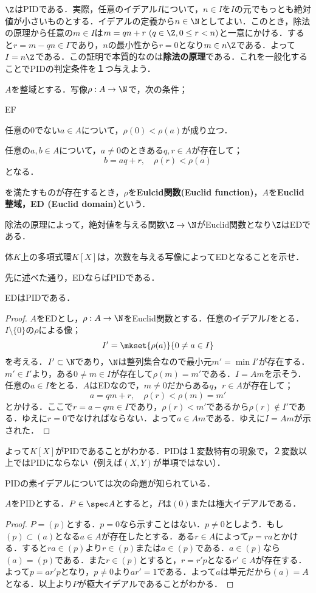 $\Z$はPIDである．実際，任意のイデアル$I$について，$n\in I$を$I$の元でもっとも絶対値が小さいものとする．イデアルの定義から$n\in\N$としてよい．このとき，除法の原理から任意の$m\in I$は$m=qn+r~(q\in\Z,0\leq r<n)$と一意にかける．すると$r=m-qn\in I$であり，$n$の最小性から$r=0$となり$m\in n\Z$である．よって$I=n\Z$である．この証明で本質的なのは\textbf{除法の原理}である．これを一般化することでPIDの判定条件を１つ与えよう．

\begin{defi}[Euclid整域]
	$A$を整域とする．写像$\rho:A\to\N$で，次の条件；
	\begin{defiterm}{EF}
		\item 任意の$0$でない$a\in A$について，$\rho(0)<\rho(a)$が成り立つ．
		\item 任意の$a,b\in A$について，$a\neq0$のときある$q,r\in A$が存在して；
		\[b=aq+r,\quad \rho(r)<\rho(a)\]
		となる．
	\end{defiterm}
	を満たすものが存在するとき，$\rho$を\textbf{Eulcid関数(Euclid function)}，$A$を\textbf{Euclid整域，ED (Euclid domain)}という．
\end{defi}

除法の原理によって，絶対値を与える関数$\Z\to\N$がEuclid関数となり$\Z$はEDである．
\begin{exer}
	体$K$上の多項式環$K[X]$は，次数を与える写像によってEDとなることを示せ．	
\end{exer}

先に述べた通り，EDならばPIDである．
\begin{thm}
	EDはPIDである．
\end{thm}
\begin{proof}
	$A$をEDとし，$\rho:A\to\N$をEuclid関数とする．任意のイデアル$I$をとる．$I\setminus\{0\}$の$\rho$による像；
	\[I'=\mkset{\rho(a)}{0\neq a\in I}\]
	を考える．$I'\subset\N$であり，$\N$は整列集合なので最小元$m'=\min I'$が存在する．$m'\in I'$より，ある$0\neq m\in I$が存在して$\rho(m)=m'$である．$I=Am$を示そう．任意の$a\in I$をとる．$A$はEDなので，$m\neq0$だからある$q，r\in A$が存在して；
	\[a=qm+r,\quad \rho(r)<\rho(m)=m'\]
	とかける．ここで$r=a-qm\in I$であり，$\rho(r)<m'$であるから$\rho(r)\not\in I'$である．ゆえに$r=0$でなければならない．よって$a\in Am$である．ゆえに$I=Am$が示された．
\end{proof}

よって$K[X]$がPIDであることがわかる．PIDは１変数特有の現象で，２変数以上ではPIDにならない（例えば$(X,Y)$が単項ではない）．

PIDの素イデアルについては次の命題が知られている．
\begin{prop}
	$A$をPIDとする．$P\in\spec A$とすると，$P$は$(0)$または極大イデアルである．
\end{prop}
\begin{proof}
	$P=(p)$とする．$p=0$なら示すことはない．$p\neq0$としよう．もし$(p)\subset (a)$となる$a\in A$が存在したとする．ある$r\in A$によって$p=ra$とかける．すると$ra\in (p)$より$r\in (p)$または$a\in (p)$である．$a\in (p)$なら$(a)=(p)$である．また$r\in (p)$とすると，$r=r'p$となる$r'\in A$が存在する．よって$p=ar'p$となり，$p\neq0$より$ar'=1$である．よって$a$は単元だから$(a)=A$となる．以上より$P$が極大イデアルであることがわかる．
\end{proof}

